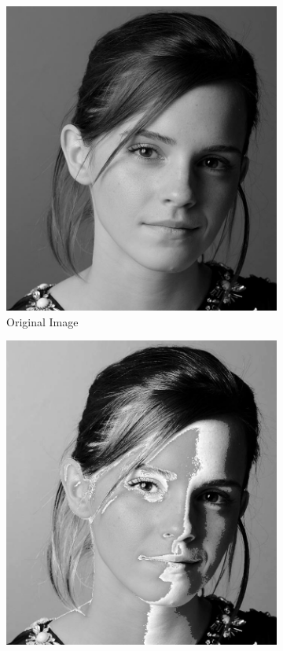 \documentclass[11pt]{article}
\begin{document}
\begin{figure}[H]
    \centering
    \begin{subfigure}{0.3\textwidth}
        \includegraphics[width=\textwidth]{resources/emma_original.jpg}
        \caption{Original Image}
    \end{subfigure}
    \hfill
    \begin{subfigure}{0.3\textwidth}
        \includegraphics[width=\textwidth]{resources/emma_transformed.jpg}

\end{subfigure}
\end{figure}
\end{document}
